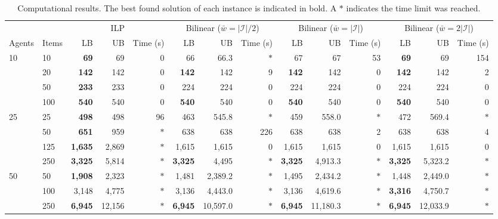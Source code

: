 \documentclass[a4paper, 11pt]{article}
\newcommand{\mc}{\mathcal}
\begin{document}
\begin{table}[htbp!]
  	\centering 
  	\renewcommand{\arraystretch}{1}
  	\caption{Computational results. The best found solution of each instance is indicated in bold. A $*$ indicates the time limit was reached.}
    \label{table:results}
  	\begin{adjustbox}{max width= \textwidth}
  	\begin{tabular}{@{\extracolsep{0pt}}llrrrrrrrrrrrr} 
		\toprule 
		& & \multicolumn{3}{c}{ILP} & \multicolumn{3}{c}{Bilinear ($\bar{w} = |\mc{I}|/2$)} & \multicolumn{3}{c}{Bilinear ($\bar{w} = |\mc{I}|$)} & \multicolumn{3}{c}{Bilinear ($\bar{w} = 2|\mc{I}| $)} \\
		\cmidrule(l){3-5} \cmidrule(l){6-8} \cmidrule(l){9-11} \cmidrule(l){12-14} 
        Agents & Items & LB & UB & Time (s) & LB & UB & Time (s) & LB & UB & Time (s) & LB & UB & Time (s) \\ 
        \midrule
        \multirow{4}{*}{10} & 10 & \textbf{69} & 69 & 0 & 66 & 66.3 & $*$ & 67 & 67 & 53 & \textbf{69} & 69 & 154 \\ 
		& 20 & \textbf{142} & 142 & 0 & \textbf{142} & 142 & 9 & \textbf{142} & 142 & 0 & \textbf{142} & 142 & 2 \\
        & 50 & \textbf{233} & 233 & 0 & 224 & 224 & 0 & 224 & 224 & 0 & 224 & 224 & 0 \\
        & 100 & \textbf{540} & 540 & 0 & \textbf{540} & 540 & 0 & \textbf{540} & 540 & 0 & \textbf{540} & 540 & 0 \\ 
        \midrule
		\multirow{4}{*}{25} & 25 & \textbf{498} & 498 & 96 & 463 & 545.8 & $*$ & 459 & 558.0 & $*$ & 472 & 569.4 & $*$ \\ 
		& 50 & \textbf{651} & 959 & $*$ & 638 & 638 & 226 & 638 & 638 & 2 & 638 & 638 & 4 \\
        & 125 & \textbf{1,635} & 2,869 & $*$ & 1,615 & 1,615 & 0 & 1,615 & 1,615 & 0 & 1,615 & 1,615 & 0 \\
        & 250 & \textbf{3,325} & 5,814 & $*$ & \textbf{3,325} & 4,495 & $*$ & \textbf{3,325} & 4,913.3 & $*$ & \textbf{3,325} & 5,323.2 & $*$ \\ 
        \midrule
		\multirow{4}{*}{50} & 50 & \textbf{1,908} & 2,323 & $*$ & 1,481 & 2,389.2 & $*$ & 1,495 & 2,434.2 & $*$ & 1,448 & 2,449.0 & $*$ \\ 
		& 100 & 3,148 & 4,775 & $*$ & 3,136 & 4,443.0 & $*$ & 3,136 & 4,619.6 & $*$ & \textbf{3,316} & 4,750.7 & $*$ \\
        & 250 & \textbf{6,945} & 12,156 & $*$ &\textbf{ 6,945} & 10,597.0 & $*$ & \textbf{6,945} & 11,180.3 & $*$ & \textbf{6,945} & 12,033.9 & $*$ \\

\end{tabular}
\end{adjustbox}
\end{table}
\end{document}
